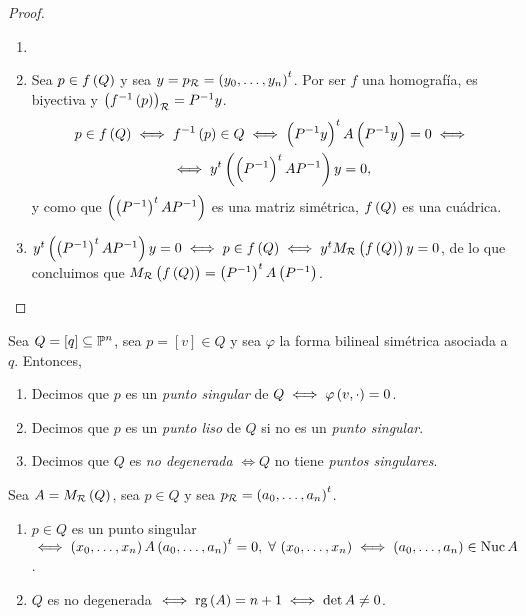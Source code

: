\begin{proof}
    \begin{enumerate}[(1)] \item[]
        \item Sea $p \in f \left( Q \right)$ y sea $y=p_{\mathcal{R}} = \left( y_0 , \dots , y_n \right) ^t$. Por ser $f$ una homografía, es biyectiva y $\left( f ^{-1} \left( p \right) \right) _{\mathcal{R}} = P^{-1} y$.
            \begin{gather*}
                p \in f \left( Q \right) \iff f^{-1} \left( p \right) \in Q \iff \left( P^{-1} y \right) ^t A \left( P^{-1} y \right) = 0 \iff \\
                \iff y^t \left( \left( P ^{-1} \right) ^t A P^{-1} \right) y = 0 ,
            \end{gather*}
            y como que $\left( \left( P ^{-1} \right) ^t A P^{-1} \right)$ es una matriz simétrica, $f \left( Q \right)$ es una cuádrica.
        \item $y^t \left( \left( P ^{-1} \right) ^t A P^{-1} \right) y = 0 \iff p \in f \left( Q \right) \iff y^t M_{\mathcal{R}} \left( f \left( Q \right) \right) y = 0$, de lo que concluimos que $M_{\mathcal{R}} \left( f \left( Q \right) \right) = \left( P^{-1} \right) ^t A \left( P^{-1} \right)$.
    \end{enumerate}
\end{proof}

\begin{defi}
    Sea $Q=\left[ q \right] \subseteq \mathbb{P} ^n$, sea $p = \left[ v \right] \in Q$ y sea $\varphi$ la forma bilineal simétrica asociada a $q$. Entonces, 
    \begin{enumerate}[(1)] 
        \item Decimos que $p$ es un \textit{punto singular} de $Q \iff \varphi \left( v, \cdot \right) = 0$.
        \item Decimos que $p$ es un \textit{punto liso} de $Q$ si no es un \textit{punto singular}.
        \item Decimos que $Q$ es \textit{no degenerada} $\iff Q$ no tiene \textit{puntos singulares}. 
    \end{enumerate}
\end{defi}

\begin{obs}
    Sea $A=M_{\mathcal{R}} \left( Q \right)$, sea $p \in Q$ y sea $p_{\mathcal{R}} = \left( a_0, \dots , a_n \right) ^t$.
    \begin{enumerate}[(1)]
        \item $p\in Q$ es un punto singular $\iff \left( x_0, \dots , x_n \right) A \left( a_0, \dots , a_n \right) ^t = 0, \; \forall \, \left( x_0, \dots , x_n \right) \iff \left( a_0, \dots , a_n \right) \in \operatorname{Nuc} A$.
        \item $Q$ es no degenerada $\iff \operatorname{rg} \left( A \right) = n+1 \iff \det A \neq 0$.
    \end{enumerate}
\end{obs}





